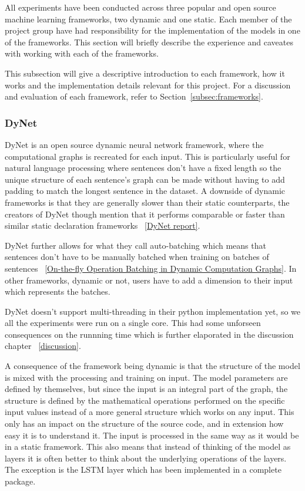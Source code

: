 All experiments have been conducted across three popular and open source machine
learning frameworks, two dynamic and one static. Each member of the project
group have had responsibility for the implementation of the models in one of the
frameworks. This section will briefly describe the experience and caveates with
working with each of the frameworks.

This subsection will give a descriptive introduction to each framework, how it
works and the implementation details relevant for this project. For a discussion
and evaluation of each framework, refer to Section~\ref{subsec:frameworks}.


\subsubsection*{DyNet}

DyNet is an open source dynamic neural network framework, where the
computational graphs is recreated for each input. This is particularly useful
for natural language processing where sentences don't have a fixed length so the
unique structure of each sentence's graph can be made without having to add
padding to match the longest sentence in the dataset. A downside of dynamic
frameworks is that they are generally slower than their static counterparts,
the creators of DyNet though mention that it performs comparable or faster than
similar static declaration frameworks ~\ref{DyNet report}.   

DyNet further allows for what they call auto-batching which means that sentences
don't have to be manually batched when training on batches of sentences
~\ref{On-the-fly Operation Batching in Dynamic Computation Graphs}. In other
frameworks, dynamic or not, users have to add a dimension to their input which
represents the batches.

DyNet doesn't support multi-threading in their python implementation yet, so we
all the experiments were run on a single core. This had some unforseen
consequences on the runnning time which is further elaporated in the discussion
chapter ~\ref{discussion}.

A consequence of the framework being dynamic is that the structure of the model
is mixed with the processing and training on input. The model parameters are
defined by themselves, but since the input is an integral part of the graph, the
structure is defined by the mathematical operations performed on the specific
input values instead of a more general structure which works on any input. This
only has an impact on the structure of the source code, and in extension how
easy it is to understand it. The input is processed in the same way as it would
be in a static framework. This also means that instead of thinking of the model
as layers it is often better to think about the underlying operations of the
layers. The exception is the LSTM layer which has been implemented in a complete
package.

